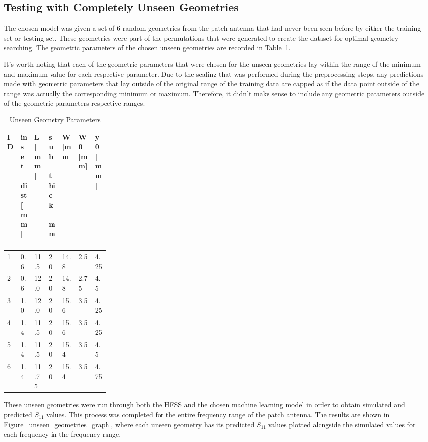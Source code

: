 \documentclass[lettersize,journal]{IEEEtran}
\begin{document}
\subsection{Testing with Completely Unseen Geometries}
The chosen model was given a set of 6 random geometries from the patch antenna that had never been seen before by either the training set or testing set. These geometries were part of the permutations that were generated to create the dataset for optimal geometry searching. The geometric parameters of the chosen unseen geometries are recorded in Table~\ref{unseen_geometries}.

It's worth noting that each of the geometric parameters that were chosen for the unseen geometries lay within the range of the minimum and maximum value for each respective parameter. Due to the scaling that was performed during the preprocessing steps, any predictions made with geometric parameters that lay outside of the original range of the training data are capped as if the data point outside of the range was actually the corresponding minimum or maximum. Therefore, it didn't make sense to include any geometric parameters outside of the geometric parameters respective ranges. 

\begin{table}[h]
\caption{Unseen Geometry Parameters}
\begin{center}
\begin{tabular}{ |l|p{0.12\linewidth}|l|p{0.12\linewidth}|l|l|l| }
    \hline
    ID & inset\_dist [mm] & L [mm] & sub\_thick [mm] & W [mm] & W0 [mm] & y0 [mm] \\ 
    \hline
    1 & 0.6 & 11.5 & 2.0 & 14.8 & 2.5 & 4.25 \\
    \hline
    2 & 0.6 & 12.0 & 2.0 & 14.8 & 2.75 & 4.5 \\
    \hline
    3 & 1.0 & 12.0 & 2.0 & 15.6 & 3.5 & 4.25 \\
    \hline
    4 & 1.4 & 11.5 & 2.0 & 15.6 & 3.5 & 4.25 \\
    \hline
    5 & 1.4 & 11.5 & 2.0 & 15.4 & 3.5 & 4.5 \\
    \hline
    6 & 1.4 & 11.75 & 2.0 & 15.4 & 3.5 & 4.75 \\
    \hline
\end{tabular}
\end{center}
\label{unseen_geometries}
\end{table}

These unseen geometries were run through both the HFSS and the chosen machine learning model in order to obtain simulated and predicted $S_{11}$ values. This process was completed for the entire frequency range of the patch antenna. The results are shown in Figure~\ref{unseen_geometries_graph}, where each unseen geometry has its predicted $S_{11}$ values plotted alongside the simulated values for each frequency in the frequency range.
\end{document}

